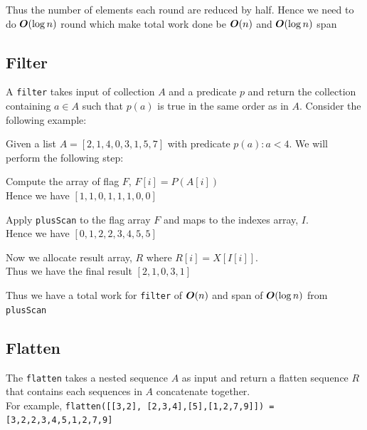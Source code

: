 \documentclass[12pt]{article}
\begin{document}
Thus the number of elements each round are reduced by half. Hence we need to do ${\boldsymbol O}(\log n)$ round which make total work done be ${\boldsymbol O}(n)$ and ${\boldsymbol O}(\log n)$ span

\subsection{Filter}
A \lstinline|filter| takes input of collection $A$ and a predicate $p$ and return the collection containing $a \in A$ such that $p(a)$ is true in the same order as in $A$. Consider the following example:

Given a list $A=[2,1,4,0,3,1,5,7]$ with predicate $p(a): a<4$. We will perform the following step:
\begin{steps}
	\item{Compute the array of flag $F$, $F[i]=P(A[i])$\\ 
	Hence  we have $[1,1,0,1,1,1,0,0]$	
	}
\item {
	Apply \lstinline|plusScan| to the flag array $F$ and maps to the indexes array, $I$. \\
	Hence we have $[0,1,2,2,3,4,5,5]$
}
\item {
	Now we allocate result array, $R$ where $R[i] = X[I[i]]$.\\
	Thus we have the final result $[2,1,0,3,1]$
}
\end{steps}

Thus we have a total work for \lstinline|filter| of ${\boldsymbol O}(n)$ and span of ${\boldsymbol O}(\log n)$ from \lstinline|plusScan|

\subsection{Flatten}
The \lstinline|flatten| takes a nested sequence $A$ as input and return a flatten sequence $R$ that contains each sequences in $A$ concatenate together.\\
For example, \lstinline|flatten([[3,2], [2,3,4],[5],[1,2,7,9]]) = [3,2,2,3,4,5,1,2,7,9]|






\end{document}
